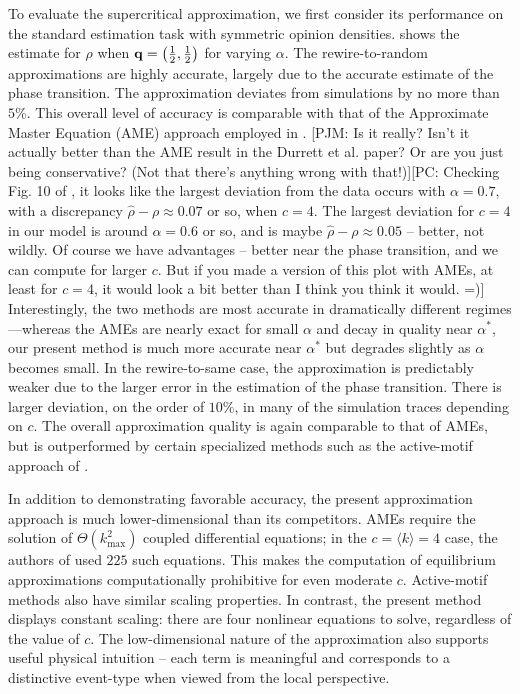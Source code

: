 \documentclass[review, onefignum, onetabnum]{siamart171218}
\newcommand{\pjm}[1]{{\color{blue}[PJM: #1]}}
\newcommand{\pc}[1]{{\color{comment_purple}[PC: #1]}}
\begin{document}
		To evaluate the supercritical approximation, we first consider its performance on the standard estimation task with symmetric opinion densities. 
		 shows the estimate for $\rho$ when $\mathbf{q} = \left(\frac{1}{2}, \frac{1}{2}\right)$ for varying $\alpha$. 
		The rewire-to-random approximations are highly accurate, largely due to the accurate estimate of the phase transition. 
		The approximation deviates from simulations by no more than $5\%$. 
		This overall level of accuracy is comparable with that of the  Approximate Master Equation (AME) approach employed in \cite{Durrett2012}. \pjm{Is it really? Isn't it actually better than the AME result in the Durrett et al. paper? Or are you just being conservative? (Not that there's anything wrong with that!)}\pc{Checking Fig. 10 of \cite{Durrett2012}, it looks like the largest deviation from the data occurs with $\alpha = 0.7$, with a discrepancy $\hat{\rho} - \rho \approx 0.07$ or so, when $c = 4$. The largest deviation for $c = 4$ in our model is around $\alpha = 0.6$ or so, and is maybe $\hat{\rho} - \rho \approx 0.05$ -- better, not wildly. Of course we have advantages -- better near the phase transition, and we can compute for larger $c$. But if you made a version of this plot with AMEs, at least for $c = 4$, it would look a bit better than I think you think it would. =)}
		Interestingly, the two methods are most accurate in dramatically different regimes---whereas the AMEs are nearly exact for small $\alpha$ and decay in quality near $\alpha^*$, our present method is much more accurate near $\alpha^*$ but degrades slightly as $\alpha$ becomes small. 
		In the rewire-to-same case, the approximation is predictably weaker due to the larger error in the estimation of the phase transition. 
		There is larger deviation, on the order of $10\%$, in many of the simulation traces depending on $c$. 
		The overall approximation quality is again comparable to that of AMEs, but is outperformed by certain specialized methods such as the active-motif approach of \cite{Demirel2012}. 
		
		In addition to demonstrating favorable accuracy, the present approximation approach is much lower-dimensional than its competitors. 
		AMEs require the solution of $\Theta\left(k_\mathrm{max}^2\right)$ coupled differential equations; in the $c = \langle k\rangle = 4$ case, the authors of \cite{Durrett2012} used $225$ such equations. 
		This makes the computation of equilibrium approximations computationally prohibitive for even moderate $c$. 
		Active-motif methods also have similar scaling properties. 
		In contrast, the present method displays constant scaling: there are four nonlinear equations to solve, regardless of the value of $c$. 
		The low-dimensional nature of the approximation also supports useful physical intuition -- each term is meaningful and corresponds to a distinctive event-type when viewed from the local perspective. 
		
\end{document}
